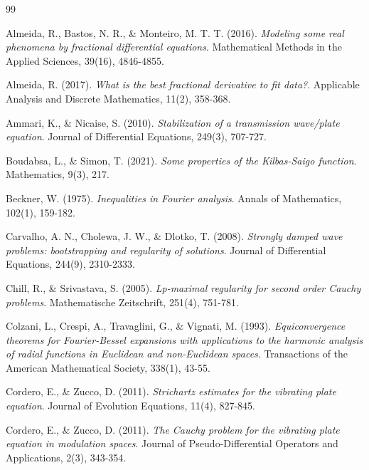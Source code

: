 \documentclass{amsart}
\theoremstyle{definition}
\theoremstyle{remark}
\numberwithin{equation}{section}
\begin{document}
{%

\newpage 

\begin{thebibliography}{99}

Almeida, R., Bastos, N. R., \& Monteiro, M. T. T. (2016). \textit{Modeling some real phenomena by fractional differential equations}. Mathematical Methods in the Applied Sciences, 39(16), 4846-4855.

Almeida, R. (2017). \textit{What is the best fractional derivative to fit data?}. Applicable Analysis and Discrete Mathematics, 11(2), 358-368.


 Ammari, K., \& Nicaise, S. (2010). \textit{Stabilization of a transmission wave/plate equation}. Journal of Differential Equations, 249(3), 707-727.



Boudabsa, L., \& Simon, T. (2021). \textit{Some properties of the Kilbas-Saigo function}. Mathematics, 9(3), 217.

Beckner, W. (1975). \textit{Inequalities in Fourier analysis}. Annals of Mathematics, 102(1), 159-182.

Carvalho, A. N., Cholewa, J. W., \& Dlotko, T. (2008). \textit{Strongly damped wave problems: bootstrapping and regularity of solutions}. Journal of Differential Equations, 244(9), 2310-2333.

Chill, R., \& Srivastava, S. (2005). \textit{Lp-maximal regularity for second order Cauchy problems}. Mathematische Zeitschrift, 251(4), 751-781.

Colzani, L., Crespi, A., Travaglini, G., \& Vignati, M. (1993). \textit{Equiconvergence theorems for Fourier-Bessel expansions with applications to the harmonic analysis of radial functions in Euclidean and non-Euclidean spaces}. Transactions of the American Mathematical Society, 338(1), 43-55.

Cordero, E., \& Zucco, D. (2011). \textit{Strichartz estimates for the vibrating plate equation}. Journal of Evolution Equations, 11(4), 827-845.

Cordero, E., \& Zucco, D. (2011). \textit{The Cauchy problem for the vibrating plate equation in modulation spaces}. Journal of Pseudo-Differential Operators and Applications, 2(3), 343-354.


\end{thebibliography}}
\end{document}
